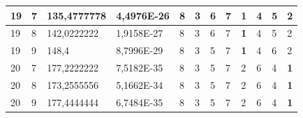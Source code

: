 \documentclass[conference]{IEEEtran}
\begin{document}
\begin{table}[]
\begin{tabular}{|llll|llllllll|}
		\multicolumn{1}{|l|}{19}  & \multicolumn{1}{l|}{7}         & \multicolumn{1}{l|}{135,4777778}   & 4,4976E-26 & \multicolumn{1}{l|}{8}   & \multicolumn{1}{l|}{3}   & \multicolumn{1}{l|}{6}   & \multicolumn{1}{l|}{7}   & \multicolumn{1}{l|}{\textbf{1}} & \multicolumn{1}{l|}{4}   & \multicolumn{1}{l|}{5}   & 2                      \\ \hline
		\multicolumn{1}{|l|}{19}  & \multicolumn{1}{l|}{8}         & \multicolumn{1}{l|}{142,0222222}   & 1,9158E-27 & \multicolumn{1}{l|}{8}   & \multicolumn{1}{l|}{3}   & \multicolumn{1}{l|}{6}   & \multicolumn{1}{l|}{7}   & \multicolumn{1}{l|}{\textbf{1}} & \multicolumn{1}{l|}{4}   & \multicolumn{1}{l|}{5}   & 2                      \\ \hline
		\multicolumn{1}{|l|}{19}  & \multicolumn{1}{l|}{9}         & \multicolumn{1}{l|}{148,4}         & 8,7996E-29 & \multicolumn{1}{l|}{8}   & \multicolumn{1}{l|}{3}   & \multicolumn{1}{l|}{5}   & \multicolumn{1}{l|}{7}   & \multicolumn{1}{l|}{\textbf{1}} & \multicolumn{1}{l|}{4}   & \multicolumn{1}{l|}{6}   & 2                      \\ \hline
		\multicolumn{1}{|l|}{20}  & \multicolumn{1}{l|}{7}         & \multicolumn{1}{l|}{177,2222222}   & 7,5182E-35 & \multicolumn{1}{l|}{8}   & \multicolumn{1}{l|}{3}   & \multicolumn{1}{l|}{5}   & \multicolumn{1}{l|}{7}   & \multicolumn{1}{l|}{2}          & \multicolumn{1}{l|}{6}   & \multicolumn{1}{l|}{4}   & \textbf{1}             \\ \hline
		\multicolumn{1}{|l|}{20}  & \multicolumn{1}{l|}{8}         & \multicolumn{1}{l|}{173,2555556}   & 5,1662E-34 & \multicolumn{1}{l|}{8}   & \multicolumn{1}{l|}{3}   & \multicolumn{1}{l|}{5}   & \multicolumn{1}{l|}{7}   & \multicolumn{1}{l|}{2}          & \multicolumn{1}{l|}{6}   & \multicolumn{1}{l|}{4}   & \textbf{1}             \\ \hline
		\multicolumn{1}{|l|}{20}  & \multicolumn{1}{l|}{9}         & \multicolumn{1}{l|}{177,4444444}   & 6,7484E-35 & \multicolumn{1}{l|}{8}   & \multicolumn{1}{l|}{3}   & \multicolumn{1}{l|}{5}   & \multicolumn{1}{l|}{7}   & \multicolumn{1}{l|}{2}          & \multicolumn{1}{l|}{6}   & \multicolumn{1}{l|}{4}   & \textbf{1}             \\ \hline
	\end{tabular}
	\label{tab:tabla1.1}
\end{table}
\end{document}
